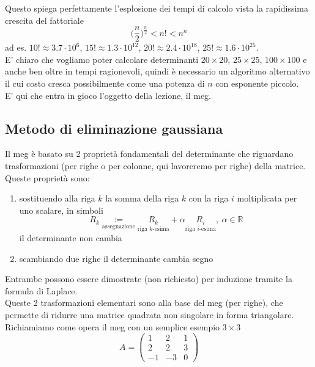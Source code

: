 \documentclass[12pt,a4paper]{article}
\begin{document}
Questo spiega perfettamente l'esplosione dei tempi di calcolo vista la rapidissima crescita del fattoriale
\begin{equation*}
    \bigl( \frac{n}{2} \bigr)^ {\frac{n}{2}} < n! < n^n
\end{equation*}
ad es. $10! \approx 3.7 \cdot 10^6$, $15! \approx 1.3 \cdot 10^{12}$, $20! \approx 2.4 \cdot 10^{18}$, $25! \approx 1.6 \cdot 10^{25}$.\\
E' chiaro che vogliamo poter calcolare determinanti $20 \times 20$, $25 \times 25$, $100 \times 100$ e anche ben oltre in tempi ragionevoli, quindi è necessario un algoritmo alternativo il cui costo cresca possibilmente come una potenza di $n$ con esponente piccolo. \\
E' qui che entra in gioco l'oggetto della lezione, il meg.

\subsection{Metodo di eliminazione gaussiana}
Il meg è basato su 2 proprietà fondamentali del determinante che riguardano trasformazioni (per righe o per colonne, qui lavoreremo per righe) della matrice. \\
Queste proprietà sono:
\begin{enumerate}
    \item sostituendo alla riga $k$ la somma della riga $k$ con la riga $i$ moltiplicata per uno scalare, in simboli
    \begin{equation*}
        R_k \underset{\text{assegnazione}}{:=} \underset{\text{riga $k$-esima}}{R_k} + \alpha \underset{\text{riga $i$-esima}}{R_i}, \ \alpha \in \mathbb{R}
    \end{equation*}
    il determinante non cambia
    \item scambiando due righe il determinante cambia segno
\end{enumerate}
Entrambe possono essere dimostrate (non richiesto) per induzione tramite la formula di Laplace.\\
Queste 2 trasformazioni elementari sono alla base del meg (per righe), che permette di ridurre una matrice quadrata non singolare in forma triangolare.\\
Richiamiamo come opera il meg con un semplice esempio $3 \times 3$
\begin{equation*}
    A=\begin{pmatrix}
       1 & 2 & 1 \\
       2 & 2 & 3 \\
       -1 & -3 & 0
    \end{pmatrix}
\end{equation*}
\end{document}
